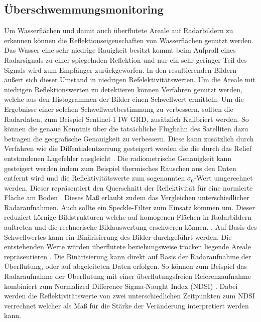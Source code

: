\subsection{Überschwemmungsmonitoring}
Um Wasserflächen und damit auch überflutete Areale auf Radarbildern zu erkennen können die Reflektionseigenschaften von Wasserflächen genutzt werden. Das Wasser eine 
sehr niedrige Rauigkeit besitzt kommt beim Aufprall eines Radarsignals zu einer spiegelnden Reflektion und nur ein sehr geringer Teil des Signals wird zum Empfänger 
zurückgeworfen. In den resultierenden Bildern äußert sich dieser Umstand in niedrigen Refelektivitätswerten. 
Um die Areale mit niedrigen Reflektionswerten zu detektieren können Verfahren genutzt werden, welche aus den Histogrammen der Bilder einen Schwellwert ermitteln.
Um die Ergebnisse einer solchen Schwellwertbestimmung zu verbessern, sollten die Radardaten, zum Beispiel Sentinel-1 IW GRD, zusätzlich Kalibriert werden. 
So können die genaue Kenntnis über die tatsächliche Flugbahn des Satelliten dazu betragen die geografische Genauigkeit zu verbessern. Diese kann zusätzlich durch Verfahren 
wie die Diffentialentzerrung gesteigert werden die die durch das Relief entstandenen Lagefehler ausgleicht \cite{einfuehrung_in_fernerkundung}.
Die radiometrische Genauigkeit kann gesteigert werden indem zum Beispiel thermisches Rauschen aus den Daten entfernt wird und die Reflektivitätswerte zum 
sogenannten $\sigma_0$-Wert umgerechnet werden. Dieser repräsentiert den Querschnitt der Reflektivität für eine normierte Fläche am Boden \cite{radiometric_calibration_of_S1_level1_products}.
Dieses Maß erlaubt zudem das Vergleichen unterschiedlicher Radaraufnahmen.  
Auch sollte ein Speckle-Filter zum Einsatz kommen um. Dieser reduziert körnige Bildstrukturen welche auf homogenen Flächen in Radarbildern auftreten und die 
rechnerische Bildauswertung erschweren können. \cite{einfuehrung_in_fernerkundung}\cite{sentinel_1_flood_mapping_tutorial}.  
Auf Basis des Schwellwertes kann ein Binärisierung des Bilder durchgeführt werden. Die entstehenden Werte würden überflutete beziehungsweise trocken liegende 
Areale repräsentieren \cite{sentinel_1_flood_mapping_tutorial}.
Die Binärisierung kann direkt auf Basis der Radaraufnahme der Überflutung, oder auf abgeleiteten Daten erfolgen. So können zum Beispiel das Radaraufnahme der Überflutung mit 
einer überflutungsfreien Referenzaufnahme kombiniert zum Normalized Difference Sigma-Naught Index (NDSI) \cite{flood_proxy_mapping_ndsi}. Dabei werden 
die Reflektivitätswerte von zwei unterschiedlichen Zeitpunkten zum NDSI verrechnet welcher als Maß für die Stärke der Veränderung interpretiert werden kann. 

